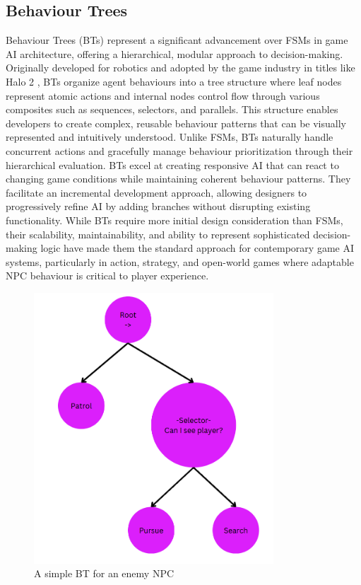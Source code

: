 \subsection{Behaviour Trees}

Behaviour Trees (BTs) represent a significant advancement over FSMs in game AI architecture, offering a hierarchical, modular approach to decision-making. 
Originally developed for robotics and adopted by the game industry in titles like Halo 2 \cite{simulacrum}, BTs organize agent behaviours into a tree structure where leaf nodes represent atomic actions and internal nodes control flow through various composites such as sequences, selectors, and parallels. 
This structure enables developers to create complex, reusable behaviour patterns that can be visually represented and intuitively understood. 
Unlike FSMs, BTs naturally handle concurrent actions and gracefully manage behaviour prioritization through their hierarchical evaluation.
BTs excel at creating responsive AI that can react to changing game conditions while maintaining coherent behaviour patterns. 
They facilitate an incremental development approach, allowing designers to progressively refine AI by adding branches without disrupting existing functionality.
While BTs require more initial design consideration than FSMs, their scalability, maintainability, and ability to represent sophisticated decision-making logic have made them the standard approach for contemporary game AI systems, particularly in action, strategy, and open-world games where adaptable NPC behaviour is critical to player experience.

\begin{figure}[H]
    \centering
    \includegraphics[width=0.8\textwidth]{figures/bt.png}
    \caption{A simple BT for an enemy NPC}
    \label{fig:bt}
\end{figure}

